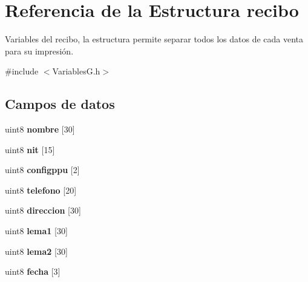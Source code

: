 \hypertarget{structrecibo}{}\section{Referencia de la Estructura recibo}
\label{structrecibo}


Variables del recibo, la estructura permite separar todos los datos de cada venta para su impresión.  




{\ttfamily \#include $<$Variables\+G.\+h$>$}

\subsection*{Campos de datos}
\begin{DoxyCompactItemize}
\item 
\mbox{\label{structrecibo_a46e829bcd14d57324eb96a3288f8fe41}} 
uint8 {\bfseries nombre} \mbox{[}30\mbox{]}
\item 
\mbox{\label{structrecibo_a1849f036555e982798ce8018a4bd9ac8}} 
uint8 {\bfseries nit} \mbox{[}15\mbox{]}
\item 
\mbox{\label{structrecibo_a0885fc20ed81dd3dfb10469441598d44}} 
uint8 {\bfseries configppu} \mbox{[}2\mbox{]}
\item 
\mbox{\label{structrecibo_a7c9fd91163815349156e4dcce7716bdf}} 
uint8 {\bfseries telefono} \mbox{[}20\mbox{]}
\item 
\mbox{\label{structrecibo_a556cb42b98ca3281993b47db2f56fc6e}} 
uint8 {\bfseries direccion} \mbox{[}30\mbox{]}
\item 
\mbox{\label{structrecibo_ae307e9a00a63bd47295d088572bbc9e7}} 
uint8 {\bfseries lema1} \mbox{[}30\mbox{]}
\item 
\mbox{\label{structrecibo_a1784e5cbbb0bffaa542b3c352a910d38}} 
uint8 {\bfseries lema2} \mbox{[}30\mbox{]}
\item 
\mbox{\label{structrecibo_a45b8e04bfea26030fccc0cde4888e869}} 
uint8 {\bfseries fecha} \mbox{[}3\mbox{]}
\item 

\end{DoxyCompactItemize}
